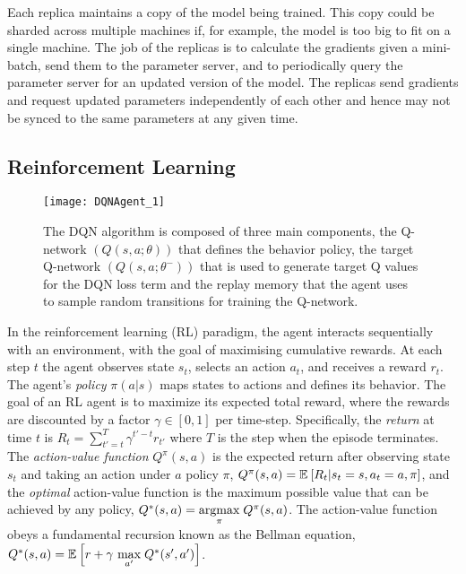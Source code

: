 \documentclass{article}
\begin{document}
Each replica maintains a copy of the model being trained. This copy could be sharded across multiple machines if, for example, the model is too big to fit on a single machine. The job of the replicas is to calculate the gradients given a mini-batch, send them to the parameter server, and to periodically query the parameter server for an updated version of the model. The replicas send gradients and request updated parameters independently of each other and hence may not be synced to the same parameters at any given time. \subsection{Reinforcement Learning}

\begin{figure}[ht]
\begin{center}
        \centerline{\texttt{[image: DQNAgent\_1]}}
        \caption{The DQN algorithm is composed of three main components, the Q-network $(Q(s,a;\theta))$ that defines the behavior policy, the target Q-network $(Q(s,a;\theta^-))$ that is used to generate target Q values for the DQN loss term and the replay memory that the agent uses to sample random transitions for training the Q-network.}
        \label{DQN-figure}
    \end{center}
    \vskip -0.2in
\end{figure}

In the reinforcement learning (RL) paradigm, the agent interacts sequentially with an environment, with the goal of maximising cumulative rewards. At each step $t$ the agent observes state $s_t$, selects an action $a_t$, and receives a reward $r_t$. The agent's \emph{policy} $\pi(a | s)$ maps states to actions and defines its behavior. The goal of an RL agent is to maximize its expected total reward, where the rewards are discounted by a factor $\gamma \in [0,1]$ per time-step. Specifically, the \emph{return} at time $t$ is $R_t =\sum\limits_{t'=t}^{T} \gamma^{t'-t}r_{t'}$  where $T$ is the step when the episode terminates. The \emph{action-value function} $Q^\pi(s,a)$ is the expected return after observing state $s_t$ and taking an action under $a$ policy $\pi$, $Q^\pi(s,a) = \mathbb{E}_{} \left[ R_t | s_t=s, a_t=a, \pi \right]$, and the \emph{optimal} action-value function is the maximum possible value that can be achieved by any policy, $Q^*(s,a) = \underset{\pi}{\operatorname{argmax}}\;{Q^\pi(s,a)}$. The action-value function obeys a fundamental recursion known as the Bellman equation, $Q^*(s,a) = \expect{}{r + \gamma \ \max{a'}{Q^*(s',a')}}$. 
\end{document}

